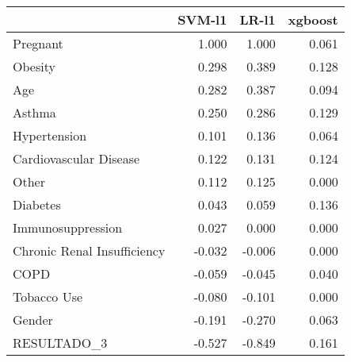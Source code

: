 \begin{tabular}{lrrr}
\toprule
{} &  SVM-l1 &  LR-l1 &  xgboost \\
\midrule
Pregnant                    &   1.000 &  1.000 &    0.061 \\
Obesity                     &   0.298 &  0.389 &    0.128 \\
Age                         &   0.282 &  0.387 &    0.094 \\
Asthma                      &   0.250 &  0.286 &    0.129 \\
Hypertension                &   0.101 &  0.136 &    0.064 \\
Cardiovascular Disease      &   0.122 &  0.131 &    0.124 \\
Other                       &   0.112 &  0.125 &    0.000 \\
Diabetes                    &   0.043 &  0.059 &    0.136 \\
Immunosuppression           &   0.027 &  0.000 &    0.000 \\
Chronic Renal Insufficiency &  -0.032 & -0.006 &    0.000 \\
COPD                        &  -0.059 & -0.045 &    0.040 \\
Tobacco Use                 &  -0.080 & -0.101 &    0.000 \\
Gender                      &  -0.191 & -0.270 &    0.063 \\
RESULTADO\_3                 &  -0.527 & -0.849 &    0.161 \\
\bottomrule
\end{tabular}
